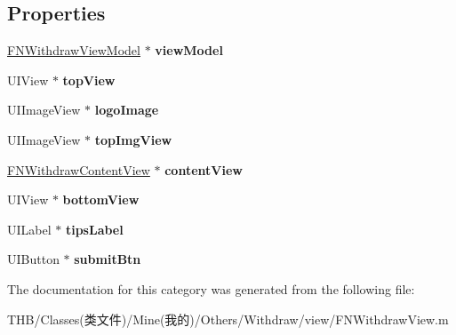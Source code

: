 \subsection*{Properties}
\begin{DoxyCompactItemize}
\item 
\mbox{\label{category_f_n_withdraw_view_07_08_a855b4e0a1efb2d66d013ecad3a39fbd5}} 
\mbox{\hyperlink{interface_f_n_withdraw_view_model}{F\+N\+Withdraw\+View\+Model}} $\ast$ {\bfseries view\+Model}
\item 
\mbox{\label{category_f_n_withdraw_view_07_08_aa54929bee763c3cd58dd9ce8e1e6eb89}} 
U\+I\+View $\ast$ {\bfseries top\+View}
\item 
\mbox{\label{category_f_n_withdraw_view_07_08_ae1cda8d0d9085cf1ba30f3502ece2da8}} 
U\+I\+Image\+View $\ast$ {\bfseries logo\+Image}
\item 
\mbox{\label{category_f_n_withdraw_view_07_08_ab996761139daa1878245118dc2751766}} 
U\+I\+Image\+View $\ast$ {\bfseries top\+Img\+View}
\item 
\mbox{\label{category_f_n_withdraw_view_07_08_a4620080eb7bf3b9216fee5af69b34f56}} 
\mbox{\hyperlink{interface_f_n_withdraw_content_view}{F\+N\+Withdraw\+Content\+View}} $\ast$ {\bfseries content\+View}
\item 
\mbox{\label{category_f_n_withdraw_view_07_08_acab5f7a77d024567b22db500d92bba4e}} 
U\+I\+View $\ast$ {\bfseries bottom\+View}
\item 
\mbox{\label{category_f_n_withdraw_view_07_08_a1a9538962236661dadeba568e6a01a6d}} 
U\+I\+Label $\ast$ {\bfseries tips\+Label}
\item 
\mbox{\label{category_f_n_withdraw_view_07_08_afcf59ae6bae5cefc7dee139cc40c34bd}} 
U\+I\+Button $\ast$ {\bfseries submit\+Btn}
\end{DoxyCompactItemize}


The documentation for this category was generated from the following file\+:\begin{DoxyCompactItemize}
\item 
T\+H\+B/\+Classes(类文件)/\+Mine(我的)/\+Others/\+Withdraw/view/F\+N\+Withdraw\+View.\+m\end{DoxyCompactItemize}
